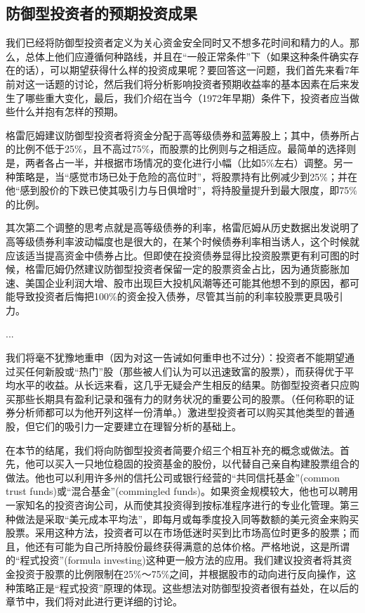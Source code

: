 \documentclass[12pt,oneside]{book}
\begin{document}
\subsection{防御型投资者的预期投资成果}
我们已经将防御型投资者定义为关心资金安全同时又不想多花时间和精力的人。那么，总体上他们应遵循何种路线，并且在“一般正常条件”下（如果这种条件确实存在的话），可以期望获得什么样的投资成果呢？要回答这一问题，我们首先来看7年前对这一话题的讨论，然后我们将分析影响投资者预期收益率的基本因素在后来发生了哪些重大变化，最后，我们介绍在当今（1972年早期）条件下，投资者应当做些什么并抱有怎样的预期。

格雷厄姆建议防御型投资者将资金分配于高等级债券和蓝筹股上；其中，债券所占的比例不低于25\%，且不高过75\%，而股票的比例则与之相适应。最简单的选择则是，两者各占一半，并根据市场情况的变化进行小幅（比如5\%左右）调整。另一种策略是，当“感觉市场已处于危险的高位时”，将股票持有比例减少到25\%；并在他“感到股价的下跌已使其吸引力与日俱增时”，将持股量提升到最大限度，即75\%的比例。

其次第二个调整的思考点就是高等级债券的利率，格雷厄姆从历史数据出发说明了高等级债券利率波动幅度也是很大的，在某个时候债券利率相当诱人，这个时候就应该适当提高资金中债券占比。但即使在投资债券显得比投资股票更有利可图的时候，格雷厄姆仍然建议防御型投资者保留一定的股票资金占比，因为通货膨胀加速、美国企业利润大增、股市出现巨大投机风潮等还可能其他想不到的原因，都可能导致投资者后悔把100\%的资金投入债券，尽管其当前的利率较股票更具吸引力。

...

我们将毫不犹豫地重申（因为对这一告诫如何重申也不过分）：投资者不能期望通过买任何新股或“热门”股（那些被人们认为可以迅速致富的股票），而获得优于平均水平的收益。从长远来看，这几乎无疑会产生相反的结果。防御型投资者只应购买那些长期具有盈利记录和强有力的财务状况的重要公司的股票。（任何称职的证券分析师都可以为他开列这样一份清单。）激进型投资者可以购买其他类型的普通股，但它们的吸引力一定要建立在理智分析的基础上。

在本节的结尾，我们将向防御型投资者简要介绍三个相互补充的概念或做法。首先，他可以买入一只地位稳固的投资基金的股份，以代替自己亲自构建股票组合的做法。他也可以利用许多州的信托公司或银行经营的“共同信托基金”(common trust funds)或“混合基金”(commingled funds)。如果资金规模较大，他也可以聘用一家知名的投资咨询公司，从而使其投资得到按标准程序进行的专业化管理。第三种做法是采取“美元成本平均法”，即每月或每季度投入同等数额的美元资金来购买股票。采用这种方法，投资者可以在市场低迷时买到比市场高位时更多的股票；而且，他还有可能为自己所持股份最终获得满意的总体价格。严格地说，这是所谓的“程式投资”(formula investing)这种更一般方法的应用。我们建议投资者将其资金投资于股票的比例限制在25\%～75\%之间，并根据股市的动向进行反向操作，这种策略正是“程式投资”原理的体现。这些想法对防御型投资者很有益处，在以后的章节中，我们将对此进行更详细的讨论。
\end{document}
